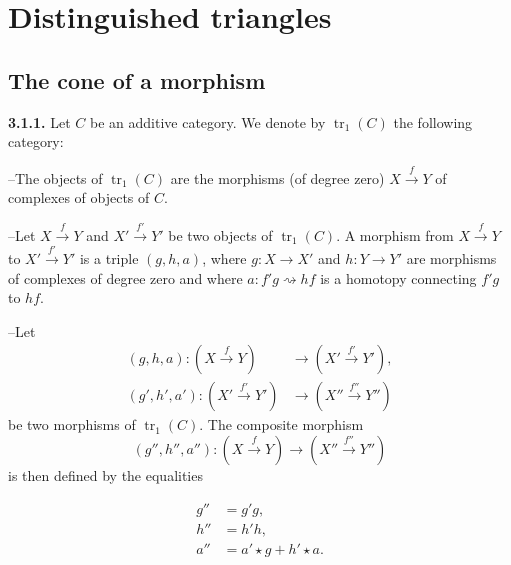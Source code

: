 \clearpage
{}%
\section{Distinguished triangles}

\subsection{The cone of a morphism}

\noindent\textbf{3.1.1.}\quad
{}
Let $C$ be an additive category. We denote by
$\operatorname{tr}_1(C)$ the following category:

\noindent--\quad The objects of $\operatorname{tr}_1(C)$ are the morphisms
(of degree zero) $X\xrightarrow{f}Y$ of complexes of objects of $C$.

\noindent--\quad Let $X\xrightarrow{f}Y$ and
$X'\xrightarrow{f'}Y'$ be two objects of $\operatorname{tr}_1(C)$. A morphism
from $X\xrightarrow{f}Y$ to $X'\xrightarrow{f'}Y'$ is a triple
$(g,h,a)$, where $g\colon X\longrightarrow X'$ and
$h\colon Y\longrightarrow Y'$ are morphisms of complexes of degree zero and
where
$a\colon f'g\rightsquigarrow hf$ is a homotopy connecting $f'g$ to $hf$.

\noindent--\quad Let
\begin{equation*}
  \begin{aligned}
    (g,h,a)\colon (X\xrightarrow{f}Y)
      &\longrightarrow (X'\xrightarrow{f'}Y'),\\
    (g',h',a')\colon (X'\xrightarrow{f'}Y')
      &\longrightarrow (X''\xrightarrow{f''}Y'')
  \end{aligned}
\end{equation*}
be two morphisms of $\operatorname{tr}_1(C)$. The composite morphism
\begin{equation*}
  (g'',h'',a'')\colon
  (X\xrightarrow{f}Y)\longrightarrow(X''\xrightarrow{f''}Y'')
\end{equation*}
is then defined by the equalities

\begin{equation}
  \begin{aligned}
    g''&=g'g,\\
    h''&=h'h,\\
    a''&=a'\star g+h'\star a.
  \end{aligned}
  \tag{3.1.1.1}
\end{equation}

